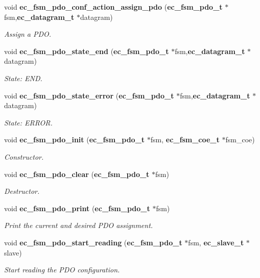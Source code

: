 \begin{DoxyCompactItemize}
void {\bf ec\-\_\-fsm\-\_\-pdo\-\_\-conf\-\_\-action\-\_\-assign\-\_\-pdo} ({\bf ec\-\_\-fsm\-\_\-pdo\-\_\-t} $\ast$fsm,{\bf ec\-\_\-datagram\-\_\-t} $\ast$datagram)
\begin{DoxyCompactList}\small\item\em \-Assign a \-P\-D\-O. \end{DoxyCompactList}\item 
void {\bf ec\-\_\-fsm\-\_\-pdo\-\_\-state\-\_\-end} ({\bf ec\-\_\-fsm\-\_\-pdo\-\_\-t} $\ast$fsm,{\bf ec\-\_\-datagram\-\_\-t} $\ast$datagram)
\begin{DoxyCompactList}\small\item\em \-State\-: \-E\-N\-D. \end{DoxyCompactList}\item 
void {\bf ec\-\_\-fsm\-\_\-pdo\-\_\-state\-\_\-error} ({\bf ec\-\_\-fsm\-\_\-pdo\-\_\-t} $\ast$fsm,{\bf ec\-\_\-datagram\-\_\-t} $\ast$datagram)
\begin{DoxyCompactList}\small\item\em \-State\-: \-E\-R\-R\-O\-R. \end{DoxyCompactList}\item 
void {\bf ec\-\_\-fsm\-\_\-pdo\-\_\-init} ({\bf ec\-\_\-fsm\-\_\-pdo\-\_\-t} $\ast$fsm, {\bf ec\-\_\-fsm\-\_\-coe\-\_\-t} $\ast$fsm\-\_\-coe)
\begin{DoxyCompactList}\small\item\em \-Constructor. \end{DoxyCompactList}\item 
void {\bf ec\-\_\-fsm\-\_\-pdo\-\_\-clear} ({\bf ec\-\_\-fsm\-\_\-pdo\-\_\-t} $\ast$fsm)
\begin{DoxyCompactList}\small\item\em \-Destructor. \end{DoxyCompactList}\item 
void {\bf ec\-\_\-fsm\-\_\-pdo\-\_\-print} ({\bf ec\-\_\-fsm\-\_\-pdo\-\_\-t} $\ast$fsm)
\begin{DoxyCompactList}\small\item\em \-Print the current and desired \-P\-D\-O assignment. \end{DoxyCompactList}\item 
void {\bf ec\-\_\-fsm\-\_\-pdo\-\_\-start\-\_\-reading} ({\bf ec\-\_\-fsm\-\_\-pdo\-\_\-t} $\ast$fsm, {\bf ec\-\_\-slave\-\_\-t} $\ast$slave)
\begin{DoxyCompactList}\small\item\em \-Start reading the \-P\-D\-O configuration. \end{DoxyCompactList}\item 

\end{DoxyCompactItemize}
